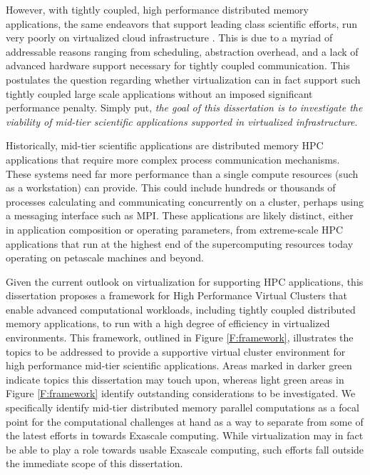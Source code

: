 However, with tightly coupled, high performance distributed memory applications, the same endeavors that support leading class scientific efforts, run very poorly on virtualized cloud infrastructure \cite{ostermann2009performance}.  This is due to a myriad of addressable reasons ranging from scheduling, abstraction overhead, and a lack of advanced hardware support necessary for tightly coupled communication. This postulates the question regarding whether virtualization can in fact support such tightly coupled large scale applications without an imposed significant performance penalty. Simply put, \emph{the goal of this dissertation is to investigate the viability of mid-tier scientific applications supported in virtualized infrastructure}.  

Historically, mid-tier scientific applications are distributed memory HPC applications that require more complex process communication mechanisms. These systems need far more performance than a single compute resources (such as a workstation) can provide. This could include hundreds or thousands of processes calculating and communicating concurrently on a cluster, perhaps using a messaging interface such as MPI.  These applications are likely distinct, either in application composition or operating parameters, from extreme-scale HPC applications that run at the highest end of the supercomputing resources today operating on petascale machines and beyond.  




Given the current outlook on virtualization for supporting HPC applications, this dissertation proposes a framework for High Performance Virtual Clusters that enable advanced computational workloads, including tightly coupled distributed memory applications, to run with a high degree of efficiency  in virtualized environments. This framework, outlined in Figure \ref{F:framework}, illustrates the topics to be addressed to provide a supportive virtual cluster environment for high performance mid-tier scientific applications.  Areas marked in darker green indicate topics this dissertation may touch upon, whereas light green areas in Figure \ref{F:framework} identify outstanding considerations to be investigated. We specifically identify mid-tier distributed memory parallel computations as a focal point for the computational challenges at hand as a way to separate from some of the latest efforts in towards Exascale \cite{dongarra2011exascale, bergman2008exascale, shalf2010exascale} computing.  While virtualization may in fact be able to play a role towards usable Exascale computing, such efforts fall outside the immediate scope of this dissertation. 


